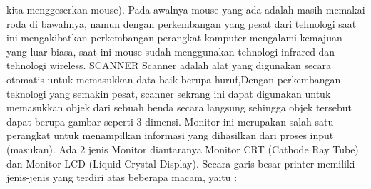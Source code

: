 kita menggeserkan mouse). Pada awalnya mouse yang ada adalah masih memakai roda di bawahnya, namun dengan perkembangan yang pesat dari tehnologi saat ini mengakibatkan perkembangan perangkat komputer mengalami kemajuan yang luar biasa, saat ini mouse sudah menggunakan tehnologi infrared dan tehnologi wireless. SCANNER Scanner adalah alat yang digunakan secara otomatis untuk memasukkan data baik berupa huruf,Dengan perkembangan teknologi yang semakin pesat, scanner sekrang ini dapat digunakan untuk memasukkan objek dari sebuah benda secara langsung sehingga objek tersebut dapat berupa gambar seperti 3 dimensi. Monitor ini merupakan salah satu perangkat untuk menampilkan informasi yang dihasilkan dari proses input (masukan). Ada 2 jenis Monitor diantaranya Monitor CRT (Cathode Ray Tube) dan Monitor LCD (Liquid Crystal Display). 
Secara garis besar printer memiliki jenis-jenis yang terdiri atas beberapa macam, yaitu :
